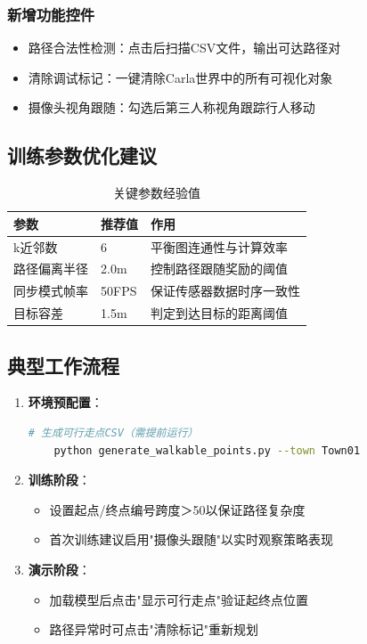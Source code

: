 \subsubsection*{新增功能控件}
\begin{itemize}
\item 路径合法性检测：点击后扫描CSV文件，输出可达路径对
\item 清除调试标记：一键清除Carla世界中的所有可视化对象
\item 摄像头视角跟随：勾选后第三人称视角跟踪行人移动
\end{itemize}

\subsection{训练参数优化建议}
\begin{table}[H]
\centering
\renewcommand{\arraystretch}{1.2}
\caption{关键参数经验值}
\begin{tabular}{lll}
\toprule
\textbf{参数} & \textbf{推荐值} & \textbf{作用} \\
\midrule
k近邻数 & 6 & 平衡图连通性与计算效率 \\
路径偏离半径 & 2.0m & 控制路径跟随奖励的阈值 \\
同步模式帧率 & 50FPS & 保证传感器数据时序一致性 \\
目标容差 & 1.5m & 判定到达目标的距离阈值 \\
\bottomrule
\end{tabular}
\end{table}

\subsection{典型工作流程}
\begin{enumerate}
\item \textbf{环境预配置}：
    \begin{lstlisting}[language=bash]
    # 生成可行走点CSV（需提前运行）
    python generate_walkable_points.py --town Town01
    \end{lstlisting}
\item \textbf{训练阶段}：
    \begin{itemize}
    \item 设置起点/终点编号跨度＞50以保证路径复杂度
    \item 首次训练建议启用"摄像头跟随"以实时观察策略表现
    \end{itemize}
\item \textbf{演示阶段}：
    \begin{itemize}
    \item 加载模型后点击"显示可行走点"验证起终点位置
    \item 路径异常时可点击"清除标记"重新规划
    \end{itemize}
\end{enumerate}

